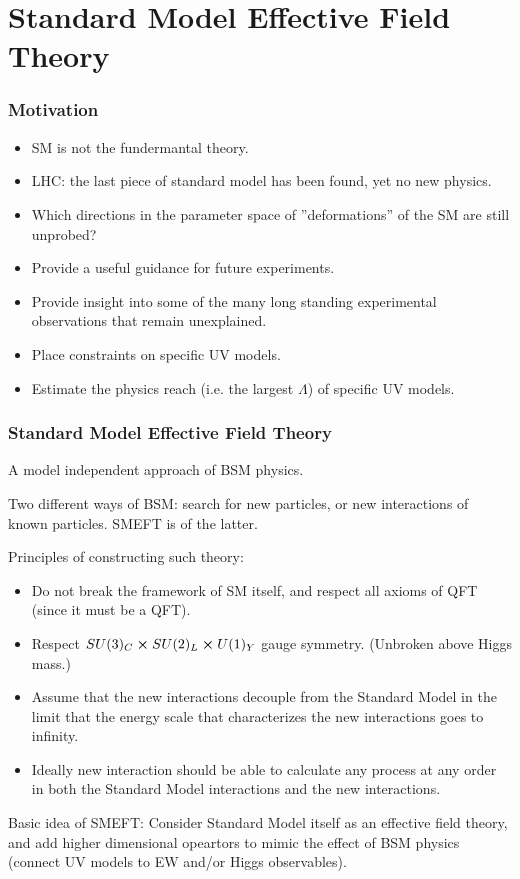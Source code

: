 \documentclass[8pt]{beamer}
\begin{document}
\section{Standard Model Effective Field Theory}
\begin{frame}
  \frametitle{Motivation}
  \begin{itemize}
  \item SM is not the fundermantal theory.

  \item LHC: the last piece of standard model has been found, yet no new physics.

  \item Which directions in the parameter space of ”deformations” of the SM are still
unprobed?

  \item Provide a useful guidance for future experiments.

  \item Provide insight into some of the
many long standing experimental observations that remain unexplained.

  \item Place constraints on specific UV models.

  \item Estimate the physics reach (i.e. the largest $\Lambda$) of specific UV models.
  \end{itemize}

\end{frame}
\begin{frame}
  \frametitle{Standard Model Effective Field Theory}
  A model independent approach of BSM physics.

  Two different ways of BSM: search for new particles, or new interactions of known particles. SMEFT is of the latter.

  Principles of constructing such theory:
  \begin{itemize}
	\item Do not break the framework of SM itself, and respect all axioms of QFT (since it must be a QFT).
	\item Respect $SU(3)_C\cross SU(2)_L\cross U(1)_Y$ gauge symmetry. (Unbroken above Higgs mass.)
	\item Assume that the new interactions decouple from the Standard Model in the limit
that the energy scale that characterizes the new interactions goes to infinity.
	\item Ideally new interaction should
be able to calculate any process at any order in both the Standard Model interactions and
the new interactions.
  \end{itemize}

  Basic idea of SMEFT: Consider Standard Model itself as an effective field theory, and add higher dimensional opeartors to mimic the effect of BSM physics (connect UV models to EW and/or Higgs observables).
\end{frame}
\end{document}
